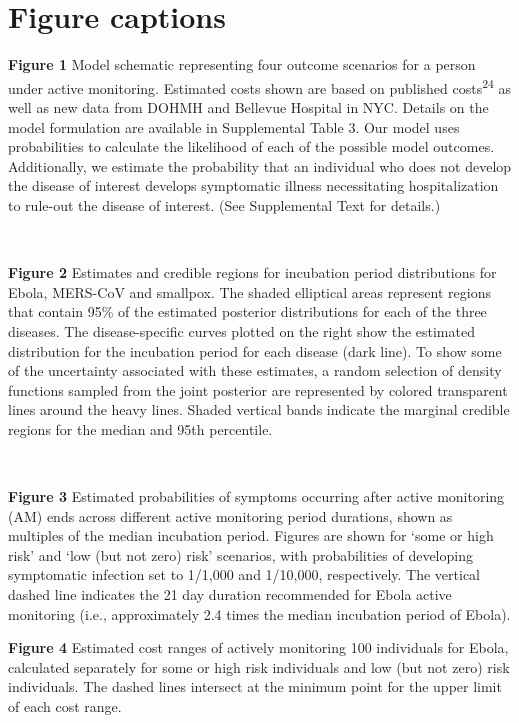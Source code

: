 \documentclass[]{article}
\begin{document}
\section{Figure captions}\label{figure-captions}

\textbf{Figure 1} Model schematic representing four outcome scenarios
for a person under active monitoring. Estimated costs shown are based on
published costs\textsuperscript{24} as well as new data from DOHMH and
Bellevue Hospital in NYC. Details on the model formulation are available
in Supplemental Table 3. Our model uses probabilities to calculate the
likelihood of each of the possible model outcomes. Additionally, we
estimate the probability that an individual who does not develop the
disease of interest develops symptomatic illness necessitating
hospitalization to rule-out the disease of interest. (See Supplemental
Text for details.)

~

\textbf{Figure 2} Estimates and credible regions for incubation period
distributions for Ebola, MERS-CoV and smallpox. The shaded elliptical
areas represent regions that contain 95\% of the estimated posterior
distributions for each of the three diseases. The disease-specific
curves plotted on the right show the estimated distribution for the
incubation period for each disease (dark line). To show some of the
uncertainty associated with these estimates, a random selection of
density functions sampled from the joint posterior are represented by
colored transparent lines around the heavy lines. Shaded vertical bands
indicate the marginal credible regions for the median and 95th
percentile.

~

\textbf{Figure 3} Estimated probabilities of symptoms occurring after
active monitoring (AM) ends across different active monitoring period
durations, shown as multiples of the median incubation period. Figures
are shown for `some or high risk' and `low (but not zero) risk'
scenarios, with probabilities of developing symptomatic infection set to
1/1,000 and 1/10,000, respectively. The vertical dashed line indicates
the 21 day duration recommended for Ebola active monitoring (i.e.,
approximately 2.4 times the median incubation period of Ebola).

\textbf{Figure 4} Estimated cost ranges of actively monitoring 100
individuals for Ebola, calculated separately for some or high risk
individuals and low (but not zero) risk individuals. The dashed lines
intersect at the minimum point for the upper limit of each cost range.
\end{document}
